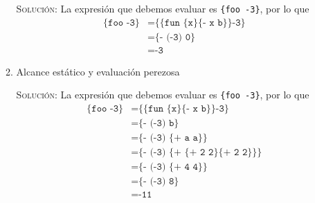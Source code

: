 \documentclass[letterpaper,11pt]{article}
\begin{document}
\begin{enumerate}
\begin{enumerate}
        \textsc{Solución:} La expresión que debemos evaluar es 
        \texttt{\{foo -3\}}, por lo que 
        \begin{align*}
            \texttt{\{foo -3\}}
            &= \texttt{\{\{fun \{x\} \{- x b\}\} -3\}} \\
            &= \texttt{\{- (-3) 0\}} \\ 
            &= \texttt{-3}
        \end{align*}
        \begin{center}
            \begin{drawstack}[scale=1.15]
            \end{drawstack}
        \end{center}

        \item Alcance estático y evaluación perezosa

        \textsc{Solución:} La expresión que debemos evaluar es 
        \texttt{\{foo -3\}}, por lo que 
        \begin{align*}
            \texttt{\{foo -3\}}
            &= \texttt{\{\{fun \{x\} \{- x b\}\} -3\}} \\
            &= \texttt{\{- (-3) b\}} \\
            &= \texttt{\{- (-3) \{+ a a\}\}} \\
            &= \texttt{\{- (-3) \{+ \{+ 2 2\} \{+ 2 2\}\}\}} \\
            &= \texttt{\{- (-3) \{+ 4 4\}\}} \\
            &= \texttt{\{- (-3) 8\}} \\
            &= \texttt{-11}
        \end{align*}
        \begin{center}
            \begin{drawstack}[scale=1.15]
            \end{drawstack}
        \end{center}


\end{enumerate}
\end{enumerate}
\end{document}

